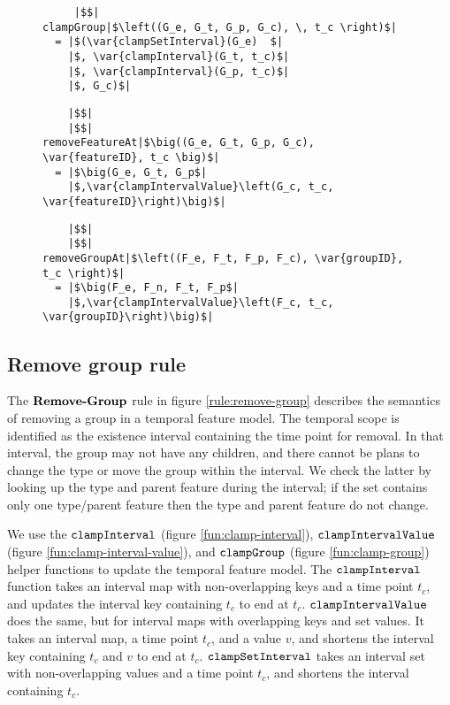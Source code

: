 \begin{figure}
\begin{minipage}{0.5\textwidth}
  \begin{verbatim}
     |$$|
clampGroup|$\left((G_e, G_t, G_p, G_c), \, t_c \right)$|
  = |$(\var{clampSetInterval}(G_e)  $|
    |$, \var{clampInterval}(G_t, t_c)$|
    |$, \var{clampInterval}(G_p, t_c)$|
    |$, G_c)$|
  \end{verbatim}
\end{minipage}

\begin{minipage}{0.6\textwidth}
  \begin{verbatim}
    |$$|
    |$$|
removeFeatureAt|$\big((G_e, G_t, G_p, G_c), \var{featureID}, t_c \big)$|
  = |$\big(G_e, G_t, G_p$|
    |$,\var{clampIntervalValue}\left(G_c, t_c, \var{featureID}\right)\big)$|
  \end{verbatim}
\end{minipage}

\begin{minipage}{0.6\textwidth}
  \begin{verbatim}
    |$$|
    |$$|
removeGroupAt|$\left((F_e, F_t, F_p, F_c), \var{groupID}, t_c \right)$|
  = |$\big(F_e, F_n, F_t, F_p$|
    |$,\var{clampIntervalValue}\left(F_c, t_c, \var{groupID}\right)\big)$|
  \end{verbatim}
\end{minipage}
\end{figure}

\subsection{Remove group rule}
\label{sub:remove-group-rule}
The $\textbf{Remove-Group}$ rule in figure \ref{rule:remove-group} describes the semantics of removing a group in a temporal feature model. The temporal scope is identified as the existence interval containing the time point for removal. In that interval, the group may not have any children, and there cannot be plans to change the type or move the group within the interval. We check the latter by looking up the type and parent feature during the interval; if the set contains only one type/parent feature then the type and parent feature do not change. 

We use the $\texttt{clampInterval}$ (figure \vref{fun:clamp-interval}), $\texttt{clampIntervalValue}$ (figure \vref{fun:clamp-interval-value}), and $\texttt{clampGroup}$ (figure \vref{fun:clamp-group}) helper functions to update the temporal feature model.  The $\texttt{clampInterval}$ function takes an interval map with non-overlapping keys and a time point $t_c$, and updates the interval key containing $t_c$ to end at $t_c$. $\texttt{clampIntervalValue}$ does the same, but for interval maps with overlapping keys and set values. It takes an interval map, a time point $t_c$, and a value $v$, and shortens the interval key containing $t_c$ and $v$ to end at $t_c$. $\texttt{clampSetInterval}$ takes an interval set with non-overlapping values and a time point $t_c$, and shortens the interval containing $t_c$. 


